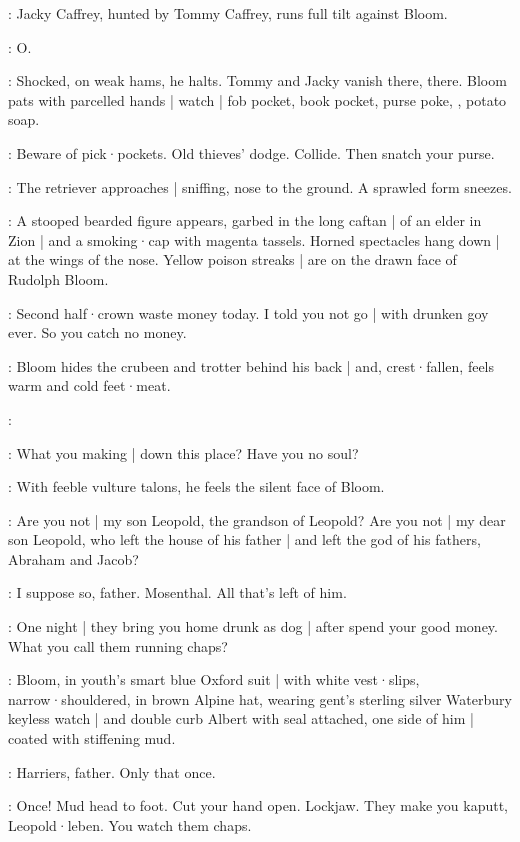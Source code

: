:
Jacky Caffrey,
hunted by Tommy Caffrey,
runs full tilt against Bloom.

\Bloom:
O.

:
Shocked,
on weak hams,
he halts.
Tommy and Jacky vanish there,
there.
Bloom pats with parcelled hands |
watch |
fob pocket,
book pocket,
purse poke,
,
potato soap.

\Bloom:
Beware of pick·pockets.
Old thieves' dodge.
Collide.
Then snatch your purse.

:
The retriever approaches |
sniffing,
nose to the ground.
A sprawled form sneezes.

:
A stooped bearded figure appears,
garbed in the long caftan |
of an elder in Zion |
and a smoking·cap with magenta tassels.
Horned spectacles hang down |
at the wings of the nose.
Yellow poison streaks |
are on the drawn face of Rudolph Bloom.

\Rudolph:
Second half·crown waste money today.
I told you not go |
with drunken goy ever.
So you catch no money.

:
Bloom hides the crubeen and trotter behind his back |
and,
crest·fallen,
feels warm and cold feet·meat.

\Bloom:

\Rudolph:
What you making |
down this place?
Have you no soul?

:
With feeble vulture talons,
he feels the silent face of Bloom.

\Rudolph:
Are you not |
my son Leopold,
the grandson of Leopold?
Are you not |
my dear son Leopold,
who left the house of his father |
and left the god of his fathers,
Abraham and Jacob?

\Bloom:
I suppose so,
father.
Mosenthal.
All that's left of him.

\Rudolph:
One night |
they bring you home drunk as dog |
after spend your good money.
What you call them running chaps?

:
Bloom,
in youth's smart blue Oxford suit |
with white vest·slips,
narrow·shouldered,
in brown Alpine hat,
wearing gent's sterling silver Waterbury keyless watch |
and double curb Albert with seal attached,
one side of him |
coated with stiffening mud.

\Bloom:
Harriers,
father.
Only that once.

\Rudolph:
Once!
Mud head to foot.
Cut your hand open.
Lockjaw.
They make you kaputt,
Leopold·leben.
You watch them chaps.

